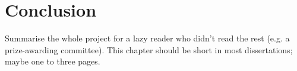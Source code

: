 \documentclass{l4proj}
\begin{document}












\chapter{Conclusion}    
Summarise the whole project for a lazy reader who didn't read the rest (e.g. a prize-awarding committee). This chapter should be short in most dissertations; maybe one to three pages.
\end{document}

